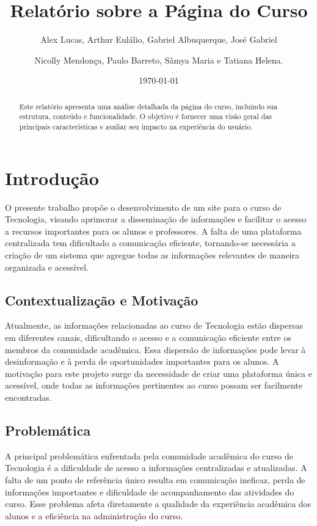 \documentclass[a4paper,12pt]{report}
\title{Relatório sobre a Página do Curso}
\author{
    Alex Lucas, Arthur Eulálio, Gabriel Albuquerque, José Gabriel \and
    Nicolly Mendonça, Paulo Barreto, Sâmya Maria e Tatiana Helena.
}
\date{\today}
\begin{document}
\maketitle

\begin{abstract}
Este relatório apresenta uma análise detalhada da página do curso, incluindo sua estrutura, conteúdo e funcionalidade. O objetivo é fornecer uma visão geral das principais características e avaliar seu impacto na experiência do usuário.
\end{abstract}

\tableofcontents
\newpage

\chapter{Introdução}
O presente trabalho propõe o desenvolvimento de um site para o curso de Tecnologia, visando aprimorar a disseminação de informações e facilitar o acesso a recursos importantes para os alunos e professores. A falta de uma plataforma centralizada tem dificultado a comunicação eficiente, tornando-se necessária a criação de um sistema que agregue todas as informações relevantes de maneira organizada e acessível.

\section{Contextualização e Motivação}
Atualmente, as informações relacionadas ao curso de Tecnologia estão dispersas em diferentes canais, dificultando o acesso e a comunicação eficiente entre os membros da comunidade acadêmica. Essa dispersão de informações pode levar à desinformação e à perda de oportunidades importantes para os alunos. A motivação para este projeto surge da necessidade de criar uma plataforma única e acessível, onde todas as informações pertinentes ao curso possam ser facilmente encontradas.

\section{Problemática}
A principal problemática enfrentada pela comunidade acadêmica do curso de Tecnologia é a dificuldade de acesso a informações centralizadas e atualizadas. A falta de um ponto de referência único resulta em comunicação ineficaz, perda de informações importantes e dificuldade de acompanhamento das atividades do curso. Esse problema afeta diretamente a qualidade da experiência acadêmica dos alunos e a eficiência na administração do curso.
\end{document}
